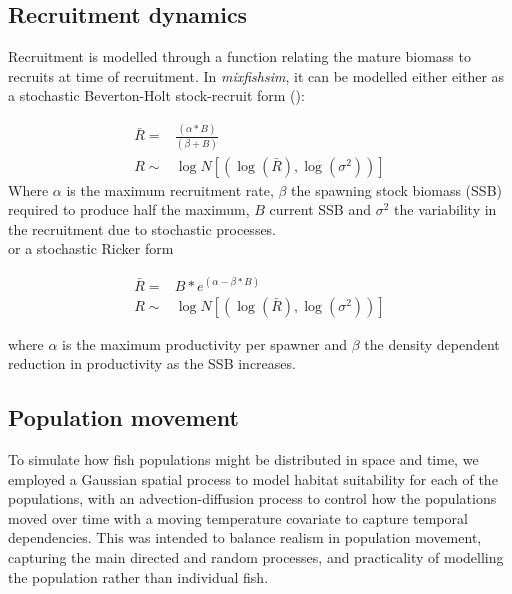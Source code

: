 \documentclass[review]{elsarticle}
\begin{document}
\subsection{Recruitment dynamics}

Recruitment is modelled through a function relating the mature biomass to
recruits at time of recruitment. In \emph{mixfishsim}, it can be modelled
either either as a stochastic Beverton-Holt stock-recruit form
(\cite{Beverton1957}): 

\begin{equation*}
	\begin{split}
	\bar{R} = & \frac{(\alpha * B)}{(\beta + B)} \\
	     R \sim & \log N[(\log(\bar{R}),\log(\sigma^2))]
	\end{split}
\end{equation*}
Where $\alpha$ is the maximum recruitment rate, $\beta$ the spawning stock
biomass (SSB) required to produce half the maximum, $B$ current SSB and
$\sigma^2$ the variability in the recruitment due to stochastic
processes. \\

or a stochastic Ricker form \cite{Ricker1954}

\begin{equation*}
	\begin{split}
	\bar{R} = & B * e^{(\alpha - \beta * B)} \\	
   	     R \sim & \log N[(\log(\bar{R}),\log(\sigma^2))]
	\end{split}
\end{equation*}

where $\alpha$ is the maximum productivity per spawner and $\beta$ the density
dependent reduction in productivity as the SSB increases.

\subsection{Population movement}

To simulate how fish populations might be distributed in space and time, we
employed a Gaussian spatial process to model habitat suitability for each of
the populations, with an advection-diffusion process to control how the
populations moved over time with a moving temperature covariate to capture
temporal dependencies. This was intended to balance realism in population
movement, capturing the main directed and random processes, and practicality of
modelling the population rather than individual fish. \\
\end{document}
